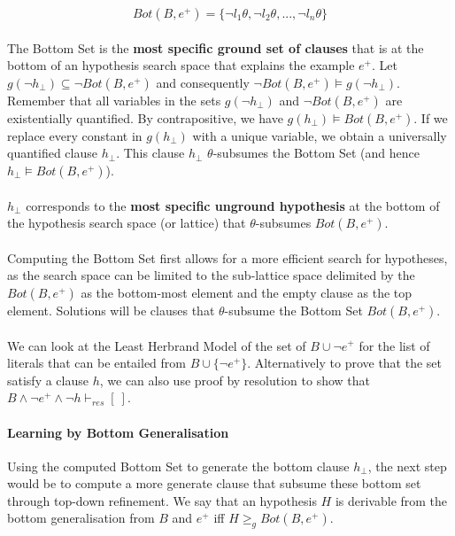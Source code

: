 \documentclass{article}
\theoremstyle{plain}
\theoremstyle{definition}
\begin{document}
\begin{multicols}{2}
$$Bot(B, e^+) = \{\lnot l_1\theta, \lnot l_2\theta, ..., \lnot l_n\theta\}$$

\paragraph{} The Bottom Set is the \textbf{most specific ground set of clauses} that is at the bottom of an hypothesis search space that explains the example $e^+$. Let $g(\lnot h_{\perp}) \subseteq \lnot Bot(B, e^+)$ and consequently $\lnot Bot(B, e^+) \models g(\lnot h_{\perp})$. Remember that all variables in the sets $g(\lnot h_{\perp})$ and $\lnot Bot(B, e^+)$ are existentially quantified. By contrapositive, we have $g(h_{\perp}) \models Bot(B, e^+)$. If we replace every constant in $g(h_{\perp})$ with a unique variable, we obtain a universally quantified clause $h_{\perp}$. This clause $h_{\perp}$ $\theta$-subsumes the Bottom Set (and hence $h_{\perp} \models Bot(B, e^+)$).

\paragraph{} $h_{\perp}$ corresponds to the \textbf{most specific unground hypothesis} at the bottom of the hypothesis search space (or lattice) that $\theta$-subsumes $Bot(B, e^+)$. 

\paragraph{} Computing the Bottom Set first allows for a more efficient search for hypotheses, as the search space can be limited to the sub-lattice space delimited by the $Bot(B, e^+)$ as the bottom-most element and the empty clause as the top element. Solutions will be clauses that $\theta$-subsume the Bottom Set $Bot(B, e^+)$.

\paragraph{} We can look at the Least Herbrand Model of the set of $B \cup {\lnot e^+}$ for the list of literals that can be entailed from $B \cup \{\lnot e^+\}$. Alternatively to prove that the set satisfy a clause $h$, we can also use proof by resolution to show that $B \land \lnot e^+ \land \lnot h \vdash_{res} [\ ]$.

\paragraph{Learning by Bottom Generalisation} Using the computed Bottom Set to generate the bottom clause $h_{\perp}$, the next step would be to compute a more generate clause that subsume these bottom set through top-down refinement. We say that an hypothesis $H$ is derivable from the bottom generalisation from $B$ and $e^+$ iff $H \geq_g Bot(B, e^+)$. 


\end{multicols}
\end{document}

